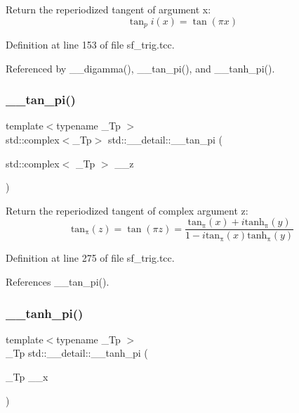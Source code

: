 Return the reperiodized tangent of argument x\+: \[ \tan_pi(x) = \tan(\pi x) \] 

Definition at line 153 of file sf\+\_\+trig.\+tcc.



Referenced by \+\_\+\+\_\+digamma(), \+\_\+\+\_\+tan\+\_\+pi(), and \+\_\+\+\_\+tanh\+\_\+pi().

\mbox{\label{namespacestd_1_1____detail_ae19d579db4245c9c4e53a70a0513bb00}} 
\subsubsection{\texorpdfstring{\+\_\+\+\_\+tan\+\_\+pi()}{\_\_tan\_pi()}\hspace{0.1cm}{\footnotesize\ttfamily [2/2]}}
{\footnotesize\ttfamily template$<$typename \+\_\+\+Tp $>$ \\
std\+::complex$<$\+\_\+\+Tp$>$ std\+::\+\_\+\+\_\+detail\+::\+\_\+\+\_\+tan\+\_\+pi (\begin{DoxyParamCaption}\item[{std\+::complex$<$ \+\_\+\+Tp $>$}]{\+\_\+\+\_\+z }\end{DoxyParamCaption})}

Return the reperiodized tangent of complex argument z\+: \[ \mathrm{tan_\pi}(z) = \tan(\pi z) = \frac{\mathrm{tan_\pi}(x) + i \mathrm{tanh_\pi}(y)} {1 - i \mathrm{tan_\pi}(x) \mathrm{tanh_\pi}(y)} \] 

Definition at line 275 of file sf\+\_\+trig.\+tcc.



References \+\_\+\+\_\+tan\+\_\+pi().

\mbox{\label{namespacestd_1_1____detail_ab0c02d3c15b8297df52b74807f22169b}} 
\subsubsection{\texorpdfstring{\+\_\+\+\_\+tanh\+\_\+pi()}{\_\_tanh\_pi()}\hspace{0.1cm}{\footnotesize\ttfamily [1/2]}}
{\footnotesize\ttfamily template$<$typename \+\_\+\+Tp $>$ \\
\+\_\+\+Tp std\+::\+\_\+\+\_\+detail\+::\+\_\+\+\_\+tanh\+\_\+pi (\begin{DoxyParamCaption}\item[{\+\_\+\+Tp}]{\+\_\+\+\_\+x }\end{DoxyParamCaption})}

